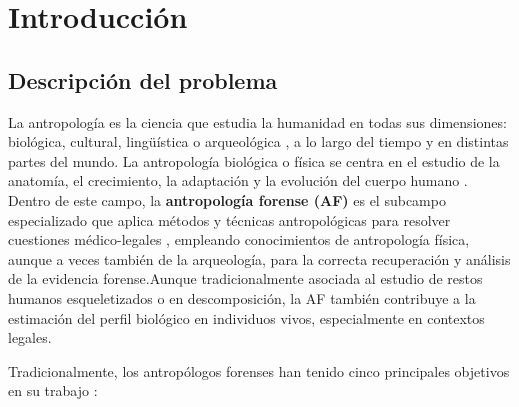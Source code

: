 
\chapter{Introducción}


\section{Descripción del problema}

La antropología es la ciencia que estudia la humanidad en todas sus dimensiones: biológica, cultural, lingüística o arqueológica \cite{AAA2022AnthropologyDefinition}, a lo largo del tiempo y en distintas partes del mundo. La antropología biológica o física se centra en el estudio de la anatomía, el crecimiento, la adaptación y la evolución del cuerpo humano \cite{nawrocki2006}. Dentro de este campo, la \textbf{antropología forense (\acrshort{AF})} es el subcampo especializado que aplica métodos y técnicas antropológicas para resolver cuestiones médico-legales \cite{nawrocki2006}, empleando conocimientos de antropología física, aunque a veces también de la arqueología, para la correcta recuperación y análisis de la evidencia forense.Aunque tradicionalmente asociada al estudio de restos humanos esqueletizados o en descomposición, la \acrshort{AF} también contribuye a la estimación del perfil biológico en individuos vivos, especialmente en contextos legales.

Tradicionalmente, los antropólogos forenses han tenido cinco principales objetivos en su trabajo \cite{byers2023}:

